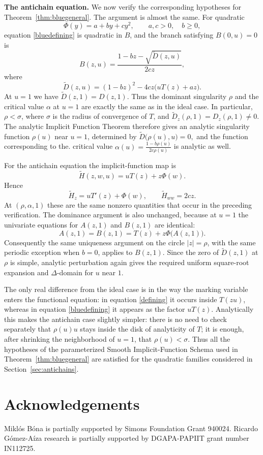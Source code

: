 \documentclass[11pt, onesided]{amsart}
\theoremstyle{remark}
\begin{document}
\medskip
\noindent\textbf{The antichain equation.}
We now verify the corresponding hypotheses for
Theorem~\ref{thm:bluegeneral}.  The argument is almost the same.  For
quadratic
\[
\Phi(y)=a+by+cy^2,
\qquad a,c>0,\quad b\geq0,
\]
equation \eqref{bluedefining} is quadratic in $B$, and the branch satisfying
$B(0,u)=0$ is
\[
B(z,u)=\frac{1-bz-\sqrt{\widetilde D(z,u)}}{2cz},
\]
where
\[
\widetilde D(z,u)
=
(1-bz)^2-4cz\bigl(uT(z)+az\bigr).
\]
At $u=1$ we have
$
\widetilde D(z,1)=D(z,1).
$
Thus the dominant singularity $\rho$ and the critical value $\alpha$ at
$u=1$ are exactly the same as in the ideal case.  In particular,
$\rho<\sigma$, where $\sigma$ is the radius of convergence of $T$, and
$\widetilde D_z(\rho,1)=D_z(\rho,1)\neq0$.  The analytic Implicit Function
Theorem therefore gives an analytic singularity function $\rho(u)$ near
$u=1$, determined by
$
\widetilde D\big(\rho(u),u\big)=0,
$
and the function corresponding to the. critical value
$
\alpha(u)=\frac{1-b\rho(u)}{2c\rho(u)}
$
is analytic as well.

For the antichain equation the implicit-function map is
\[
\widetilde H(z,w,u)=uT(z)+z\Phi(w).
\]
Hence
\[
\widetilde H_z=uT'(z)+\Phi(w),
\qquad
\widetilde H_{ww}=2cz.
\]
At $(\rho,\alpha,1)$ these are the same nonzero quantities that occur in
the preceding verification.  The dominance argument is also unchanged,
because at $u=1$ the univariate equations for $A(z,1)$ and $B(z,1)$ are
identical:
\[
A(z,1)=B(z,1)=T(z)+z\Phi\bigl(A(z,1)\bigr).
\]
Consequently the same uniqueness argument on the circle $|z|=\rho$, with
the same periodic exception when $b=0$, applies to $B(z,1)$.  Since the
zero of $\widetilde D(z,1)$ at $\rho$ is simple, analytic perturbation again
gives the required uniform square-root expansion and $\Delta$-domain for
$u$ near $1$.

The only real difference from the ideal case is in the way the marking
variable enters the functional equation: in equation \eqref{defining} it occurs
inside $T(zu)$, whereas in equation \eqref{bluedefining} it appears as the factor
$uT(z)$.  Analytically this makes the antichain case slightly simpler:
there is no need to check separately that $\rho(u)u$ stays inside the disk
of analyticity of $T$; it is enough, after shrinking the neighborhood of
$u=1$, that $\rho(u)<\sigma$.  Thus all the hypotheses of the parameterized
Smooth Implicit-Function Schema used in
Theorem~\ref{thm:bluegeneral} are satisfied for the quadratic families
considered in Section~\ref{sec:antichains}.

\section*{Acknowledgements}
Mikl\'os B\'ona  is partially supported by Simons Foundation Grant 940024.
Ricardo Gómez-Aíza research is partially supported by DGAPA-PAPIIT grant number IN112725.
\end{document}
